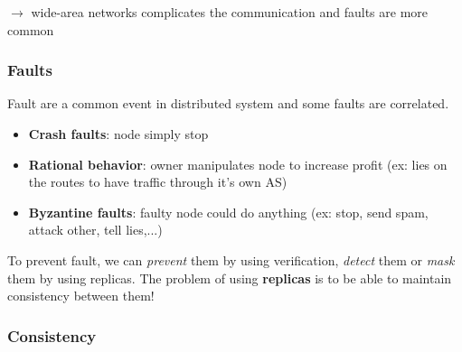 $\rightarrow$ wide-area networks complicates the communication and faults are
more common

\subsubsection{Faults}

Fault are a common event in distributed system and some faults
are correlated.

\begin{itemize}
    \item \textbf{Crash faults}: node simply stop
    \item \textbf{Rational behavior}: owner manipulates node to increase profit
        (ex: lies on the routes to have traffic through it's own AS)
    \item \textbf{Byzantine faults}: faulty node could do anything (ex: stop, send spam,
        attack other, tell lies,...)
\end{itemize}

To prevent fault, we can \textit{prevent} them by using verification,
\textit{detect} them or \textit{mask} them by using replicas. The problem of
using \textbf{replicas} is to be able to maintain consistency between them!

\subsubsection{Consistency}

